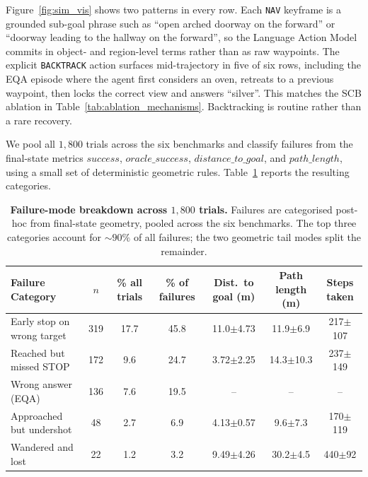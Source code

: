 \documentclass[conference]{IEEEtran}
\begin{document}
Figure~\ref{fig:sim_vis} shows two patterns in every row. Each \texttt{NAV}
keyframe is a grounded sub-goal phrase such as ``open arched doorway on the
forward'' or ``doorway leading to the hallway on the forward'', so the
Language Action Model commits in object- and region-level terms rather than as
raw waypoints. The explicit \texttt{BACKTRACK} action surfaces mid-trajectory
in five of six rows, including the EQA episode where the agent first considers
an oven, retreats to a previous waypoint, then locks the correct view and
answers ``silver''. This matches the SCB ablation in
Table~\ref{tab:ablation_mechanisms}. Backtracking is routine rather than a
rare recovery.

We pool all $1{,}800$ trials across the six benchmarks and classify failures
from the final-state metrics $\mathit{success}$, $\mathit{oracle\_success}$,
$\mathit{distance\_to\_goal}$, and $\mathit{path\_length}$, using a small set
of deterministic geometric rules. Table~\ref{tab:failure_modes} reports the
resulting categories.

\begin{table}[t]
\centering
\caption{\textbf{Failure-mode breakdown across $1{,}800$ trials.}
Failures are categorised post-hoc from final-state
geometry, pooled across the six benchmarks. The top three categories
account for $\sim$$90\%$ of all failures; the two geometric tail modes
split the remainder.}
\label{tab:failure_modes}
\vspace{-6pt}
{\fontsize{9pt}{11pt}\selectfont
\setlength{\tabcolsep}{8pt}
\begin{tabular}{l|cccccc}
\toprule
\textbf{Failure Category} &
\textbf{$n$} & \textbf{\% all trials} & \textbf{\% of failures} &
\textbf{Dist.~to goal (m)} & \textbf{Path length (m)} & \textbf{Steps taken} \\
\midrule
Early stop on wrong target  & 319 & 17.7 & 45.8 & 11.0$\pm$4.73 & 11.9$\pm$6.9 & 217$\pm$107 \\
Reached but missed STOP     & 172 & 9.6  & 24.7 & 3.72$\pm$2.25 & 14.3$\pm$10.3 & 237$\pm$149 \\
Wrong answer (EQA)            & 136 & 7.6  & 19.5 & --   & --   & --   \\
Approached but undershot      & 48  & 2.7  & 6.9  & 4.13$\pm$0.57 & 9.6$\pm$7.3   & 170$\pm$119 \\
Wandered and lost               & 22  & 1.2  & 3.2  & 9.49$\pm$4.26 & 30.2$\pm$4.5  & 440$\pm$92  \\
\bottomrule
\end{tabular}}
\end{table}
\end{document}
